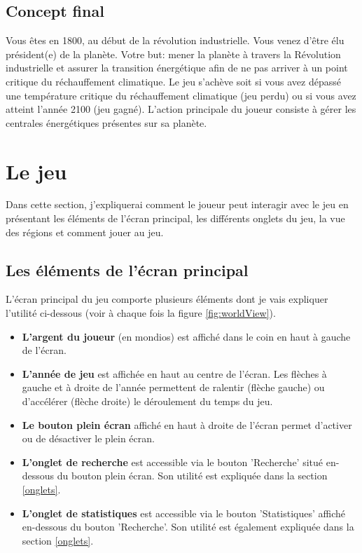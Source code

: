\documentclass{article}
\begin{document}
        \subsection{Concept final}
		Vous êtes en 1800, au début de la révolution industrielle. Vous venez d'être élu président(e) de la planète. Votre but: mener la planète à travers la Révolution industrielle et assurer la transition énergétique afin de ne pas arriver à un point critique du réchauffement climatique. Le jeu s'achève soit si vous avez dépassé une température critique du réchauffement climatique (jeu perdu) ou si vous avez atteint l'année 2100 (jeu gagné).
        L'action principale du joueur consiste à gérer les centrales énergétiques présentes sur sa planète.

        \section{Le jeu}
		Dans cette section, j'expliquerai comment le joueur peut interagir avec le jeu en présentant les éléments de l'écran principal, les différents onglets du jeu, la vue des régions et comment jouer au jeu.        
        
        \subsection{Les éléments de l'écran principal}
		L'écran principal du jeu comporte plusieurs éléments dont je vais expliquer l'utilité ci-dessous (voir à chaque fois la figure \ref{fig:worldView}).
		
		\begin{itemize}
			\item \textbf{L'argent du joueur} (en mondios) est affiché dans le coin en haut à gauche de l'écran.
			\item \textbf{L'année de jeu} est affichée en haut au centre de l'écran. Les flèches à gauche et à droite de l'année permettent de ralentir (flèche gauche) ou d’accélérer (flèche droite) le déroulement du temps du jeu.
			\item \textbf{Le bouton plein écran} affiché en haut à droite de l'écran permet d'activer ou de désactiver le plein écran.
			\item \textbf{L'onglet de recherche} est accessible via le bouton 'Recherche' situé en-dessous du bouton plein écran. Son utilité est expliquée dans la section \ref{onglets}.
			\item  \textbf{L'onglet de statistiques} est accessible via le bouton 'Statistiques' affiché en-dessous du bouton 'Recherche'. Son utilité est également expliquée dans la section \ref{onglets}.
		\end{itemize}
		
\end{document}
